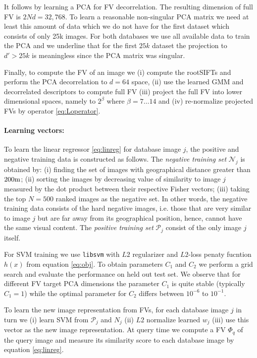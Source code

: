 \documentclass[table]{article} %
\begin{document}
	    	It follows by learning a PCA for FV decorrelation. The resulting dimension of full FV is $2Nd=32,768$. To learn a reasonable non-singular PCA matrix we need at least this amount of data which we do not have for the first dataset which consists of only 25k images. For both databases we use all available data to train the PCA and we underline that for the first $25k$ dataset the projection to $d'>25k$ is meaningless since the PCA matrix was singular.

	    	Finally, to compute the FV of an image we (i) compute the rootSIFTs and perform the PCA decorrelation to $d=64$ space, (ii) use the learned GMM and decorrelated descriptors to compute full FV (iii) project the full FV into lower dimensional spaces, namely to $2^\beta$ where $\beta=7\dots 14$ and (iv) re-normalize projected FVs by operator \eqref{eq:Loperator}.

	    \vspace{-4mm}
	    \paragraph{Learning vectors:}
			To learn the linear regressor \eqref{eq:linreg} for database image $j$, the positive and negative training data is constructed as follows. 
			The \emph{negative training set} $\mathcal N_j$ is obtained by: (i) finding the set of images with geographical distance greater than $200{\rm m}$; (ii)  sorting the images by decreasing value of similarity to image $j$ measured by the dot product between their respective Fisher vectors; (iii) taking the top $N=500$ ranked images as the negative set. 
			In other words, the negative training data consists of the hard negative images, i.e. those that are very similar to image $j$ but are far away from its geographical position, hence, cannot have the same visual content. The \emph{positive training set} $\mathcal P_j$ consist of the only image $j$ itself.

			For SVM training we use {\tt libsvm} \cite{libsvm} with $L2$ regularizer and $L2$-loss penaty fucntion $h(x)$ from equation \eqref{eq:obj}. To obtain parameters $C_1$ and $C_2$ we perform a grid search and evaluate the performance on held out test set. We observe that for different FV target PCA dimensions the parameter $C_1$ is quite stable (typically $C_1=1$) while the optimal parameter for $C_2$ differs between $10^{-6}$ to $10^{-1}$.

			To learn the new image representation from FVs, for each database image $j$ in turn we (i) learn SVM from $\mathcal P_j$ and $N_j$ (ii) $L2$ normalize learned $w_j$ (iii) use this vector as the new image representation. At query time we compute a FV $\Phi_q$ of the query image and measure its similarity score to each database image by equation \eqref{eq:linreg}.
		
\end{document}
